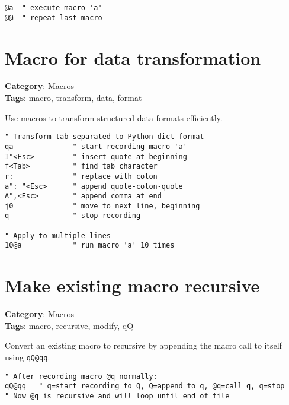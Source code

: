 {{{{{{\begin{Exa*}{}
\begin{Verbatim}[fontsize=\footnotesize, breaklines, breakanywhere]
@a  " execute macro 'a'
@@  " repeat last macro
\end{Verbatim}
\end{Exa*}

\section{Macro for data transformation}

\textbf{Category}: Macros\\ \textbf{Tags}: macro, transform, data, format
\vspace{0.5cm}

Use macros to transform structured data formats efficiently.

\begin{Exa*}{}
\begin{Verbatim}[fontsize=\footnotesize, breaklines, breakanywhere]
" Transform tab-separated to Python dict format
qa              " start recording macro 'a'
I"<Esc>         " insert quote at beginning
f<Tab>          " find tab character
r:              " replace with colon
a": "<Esc>      " append quote-colon-quote
A",<Esc>        " append comma at end
j0              " move to next line, beginning
q               " stop recording

" Apply to multiple lines
10@a            " run macro 'a' 10 times
\end{Verbatim}
\end{Exa*}

\section{Make existing macro recursive}

\textbf{Category}: Macros\\ \textbf{Tags}: macro, recursive, modify, qQ
\vspace{0.5cm}

Convert an existing macro to recursive by appending the macro call to itself using {\footnotesize \Verb§qQ@qq§}.

\begin{Exa*}{}
\begin{Verbatim}[fontsize=\footnotesize, breaklines, breakanywhere]
" After recording macro @q normally:
qQ@qq   " q=start recording to Q, Q=append to q, @q=call q, q=stop
" Now @q is recursive and will loop until end of file
\end{Verbatim}
\end{Exa*}

}}}}}}
